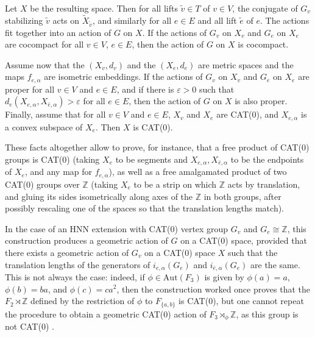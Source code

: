 \documentclass  [a4paper, 11pts] {article}
\newcommand{\Z}{\mathbb{Z}}
\newcommand{\eps}{\varepsilon}
\newcommand{\Aut}{{\mathrm{Aut}}}
\begin{document}
Let $X$ be the resulting space. Then for all lifts $\tilde{v}\in T$ of $v\in V$, the conjugate of $G_v$ stabilizing $\tilde{v}$ acts on $\tilde{X}_{\tilde{v}}$, and similarly for all $e\in E$ and all lift $\tilde{e}$ of $e$. The actions fit together into an action of $G$ on $X$. If the actions of $G_v$ on $X_v$ and $G_e$ on $X_e$ are cocompact for all $v\in V$, $e\in E$, then the action of $G$ on $X$ is cocompact.

Assume now that the $(X_v, d_v)$ and the $(X_e, d_e)$ are metric spaces and the maps $f_{e, \alpha}$ are isometric embeddings. If the actions of $G_v$ on $X_v$ and $G_e$ on $X_e$ are proper for all $v\in V$ and $e\in E$, and if there is $\eps > 0$ such that $d_e(X_{e, \alpha}, X_{\bar{e}, \alpha}) > \eps$ for all $e\in E$, then the action of $G$ on $X$ is also proper. Finally, assume that for all $v\in V$ and $e\in E$, $X_v$ and $X_e$ are CAT(0), and $X_{e, \alpha}$ is a convex subspace of $X_e$. Then $X$ is CAT(0).

These facts altogether allow to prove, for instance, that a free product of CAT(0) groups is CAT(0) (taking $X_e$ to be segments and $X_{e, \alpha}, X_{\bar{e}, \alpha }$ to be the endpoints of $X_e$, and any map  for $f_{e, \alpha}$), as well as a free amalgamated product of two CAT(0) groups over $\Z$ (taking $X_e$ to be a strip on which $\Z$ acts by translation, and gluing its sides isometrically along axes of the $\Z$ in both groups, after possibly rescaling one of the spaces so that the translation lengths match).

In the case of an HNN extension with CAT(0) vertex group $G_v$ and $G_e\cong \Z$, this construction produces a geometric action of $G$ on a CAT(0) space, provided that there exists a geometric action of $G_v$ on a CAT(0) space $X$ such that the translation lengths of the generators of $i_{e, \alpha}(G_e)$ and $i_{\bar{e}, \alpha}(G_e)$ are the same. This is not always the case: indeed, if $\phi\in \Aut(F_3)$ is given by $\phi(a)=a$, $\phi(b)=ba$, and $\phi(c)=ca^2$, then the construction worked once proves that the $F_2\rtimes\Z$ defined by the restriction of $\phi$ to $F_{\{a, b\}}$ is CAT(0), but one cannot repeat the procedure to obtain a geometric CAT(0) action of $F_3\rtimes_\phi\Z$, as this group is not CAT(0) \cite{Ger94}.
\end{document}
